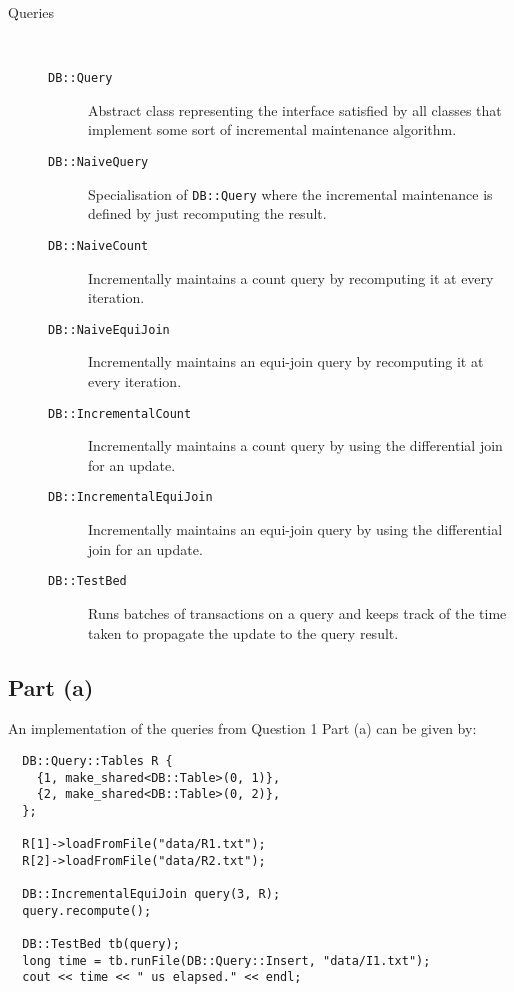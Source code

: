\begin{description}
\begin{description}
    \end{description}
  \item[Queries]~\\
    \begin{description}
      \item[\textnormal{\texttt{DB::Query}}] Abstract class representing the interface satisfied by all classes that implement some sort of incremental maintenance algorithm.
      \item[\textnormal{\texttt{DB::NaiveQuery}}] Specialisation of \texttt{DB::Query} where the incremental maintenance is defined by just recomputing the result.
      \item[\textnormal{\texttt{DB::NaiveCount}}] Incrementally maintains a count query by recomputing it at every iteration.
      \item[\textnormal{\texttt{DB::NaiveEquiJoin}}] Incrementally maintains an equi-join query by recomputing it at every iteration.
      \item[\textnormal{\texttt{DB::IncrementalCount}}] Incrementally maintains a count query by using the differential join for an update.
      \item[\textnormal{\texttt{DB::IncrementalEquiJoin}}] Incrementally maintains an equi-join query by using the differential join for an update.
      \item[\textnormal{\texttt{DB::TestBed}}] Runs batches of transactions on a query and keeps track of the time taken to propagate the update to the query result.
    \end{description}
\end{description}

\subsection{Part (a)}\label{sec:q-2-a}

An implementation of the queries from Question 1 Part (a) can be given by:

\begin{verbatim}
  DB::Query::Tables R {
    {1, make_shared<DB::Table>(0, 1)},
    {2, make_shared<DB::Table>(0, 2)},
  };

  R[1]->loadFromFile("data/R1.txt");
  R[2]->loadFromFile("data/R2.txt");

  DB::IncrementalEquiJoin query(3, R);
  query.recompute();

  DB::TestBed tb(query);
  long time = tb.runFile(DB::Query::Insert, "data/I1.txt");
  cout << time << " us elapsed." << endl;
\end{verbatim}

